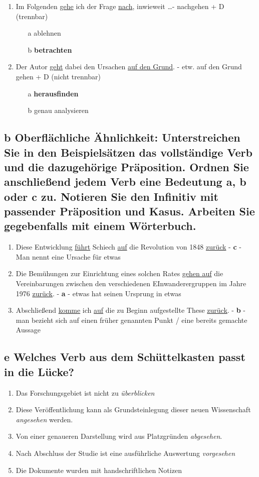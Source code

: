\documentclass{article}
\begin{document}
\begin{enumerate}
				\item{Im Folgenden \underline{gehe} ich der Frage \underline{nach}, inwieweit \dots - nachgehen + D (trennbar)}
		\begin{itemize}
			\item[a]{ablehnen}
			\item[b]{\textbf{betrachten}}
		\end{itemize}
				\item{Der Autor \underline{geht} dabei den Ursachen \underline{auf den Grund}. - etw. auf den Grund gehen + D (nicht trennbar)}
		\begin{itemize}
			\item[a]{\textbf{herausfinden}}
			\item[b]{genau analysieren}
		\end{itemize}
	\end{enumerate}

	\subsection*{\textbf{b} Oberflächliche Ähnlichkeit: Unterstreichen Sie in den Beispielsätzen das vollständige Verb und die dazugehörige Präposition. Ordnen Sie anschließend jedem Verb eine Bedeutung a, b oder c zu. Notieren Sie den Infinitiv mit passender Präposition und Kasus. Arbeiten Sie gegebenfalls mit einem Wörterbuch.}
	\begin{enumerate}
		\item{Diese Entwicklung \underline{führt} Schiech \underline{auf} die Revolution von 1848 \underline{zurück} - \textbf{c} - Man nennt eine Ursache für etwas}
		\item{Die Bemühungen zur Einrichtung eines solchen Rates \underline{gehen auf} die Vereinbarungen zwischen den verschiedenen EInwanderergruppen im Jahre 1976 \underline{zurück}. - \textbf{a} - etwas hat seinen Ursprung in etwas}
		\item{Abschließend \underline{komme} ich \underline{auf} die zu Beginn aufgestellte These \underline{zurück}. - \textbf{b} - man bezieht sich auf einen früher genannten Punkt / eine bereits gemachte Aussage}
	\end{enumerate}
	\subsection*{\textbf{e} Welches Verb aus dem Schüttelkasten passt in die Lücke?}
	\begin{enumerate}
		\item{Das Forschungsgebiet ist nicht zu \textit{überblicken}}
		\item{Diese Veröffentlichung kann als Grundsteinlegung dieser neuen Wissenschaft \textit{angesehen} werden.}
		\item{Von einer genaueren Darstellung wird aus Platzgründen \textit{abgesehen}.}
		\item{Nach Abschluss der Studie ist eine ausführliche Auswertung \textit{vorgesehen}}
		\item{Die Dokumente wurden mit handschriftlichen Notizen}
	\end{enumerate}
\end{document}
